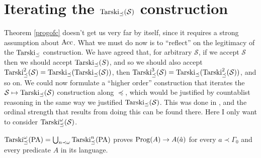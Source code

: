 \documentclass{amsart}
\begin{document}
\section{Iterating the ${\rm Tarski}_{\preceq}(\mathcal{S})$ construction}

Theorem \ref{progofc} doesn't get us very far by itself, since it requires a strong assumption about
${\rm Acc}$. What we must do now is to ``reflect'' on the legitimacy of the
${\rm Tarski}_{\preceq}$ construction. We have agreed that, for arbitrary $\mathcal{S}$, if we
accept $\mathcal{S}$ then we should accept ${\rm Tarski}_{\preceq}(S)$, and so we should also accept
${\rm Tarski}^2_{\preceq}(\mathcal{S}) = {\rm Tarski}_{\preceq}({\rm Tarski}_{\preceq}(\mathcal{S}))$,
then ${\rm Tarski}^3_{\preceq}(\mathcal{S}) = {\rm Tarski}_{\preceq}({\rm Tarski}^2_{\preceq}(\mathcal{S}))$,
and so on. We could now formulate a ``higher order'' construction that iterates the $\mathcal{S} \mapsto
{\rm Tarski}_{\preceq}(\mathcal{S})$ construction along $\preceq$, which would be justified by countablist
reasoning in the same way we justified ${\rm Tarski}_{\preceq}(\mathcal{S})$. This was done in \cite{weaver},
and the ordinal strength that results from doing this can be found there. Here I only want to consider
${\rm Tarski}^\omega_{\preceq}(\mathcal{S})$.

\begin{theo}
${\rm Tarski}^\omega_{\preceq}({\rm PA}) = \bigcup_{n \prec \omega}
{\rm Tarski}^n_{\preceq}({\rm PA})$ proves ${\rm Prog}(A) \to A(\hat{a})$ for every $a \prec \Gamma_0$
and every predicate $A$ in its language.
\end{theo}
\end{document}
